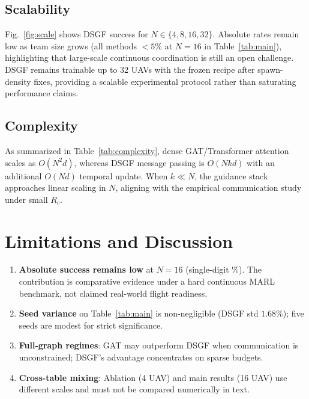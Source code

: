 \subsection{Scalability}
\label{sec:scale-results}
Fig.~\ref{fig:scale} shows DSGF success for $N\in\{4,8,16,32\}$.
Absolute rates remain low as team size grows (all methods $<5\%$ at $N{=}16$
in Table~\ref{tab:main}), highlighting that large-scale continuous coordination
is still an open challenge.
DSGF remains trainable up to $32$ UAVs with the frozen recipe after spawn-density
fixes, providing a scalable experimental protocol rather than saturating
performance claims.

\subsection{Complexity}
\label{sec:complexity-disc}
As summarized in Table~\ref{tab:complexity}, dense GAT/Transformer attention
scales as $O(N^{2}d)$, whereas DSGF message passing is $O(Nkd)$ with an
additional $O(Nd)$ temporal update.
When $k\ll N$, the guidance stack approaches linear scaling in $N$, aligning
with the empirical communication study under small $R_c$.


\section*{Limitations and Discussion}
\label{sec:limitations}

\begin{enumerate}
  \item \textbf{Absolute success remains low} at $N{=}16$ (single-digit \%).
        The contribution is comparative evidence under a hard continuous MARL
        benchmark, not claimed real-world flight readiness.
  \item \textbf{Seed variance} on Table~\ref{tab:main} is non-negligible
        (DSGF std $1.68\%$); five seeds are modest for strict significance.
  \item \textbf{Full-graph regimes}: GAT may outperform DSGF when communication
        is unconstrained; DSGF's advantage concentrates on sparse budgets.
  \item \textbf{Cross-table mixing}: Ablation (4 UAV) and main results (16 UAV)
        use different scales and must not be compared numerically in text.
\end{enumerate}

